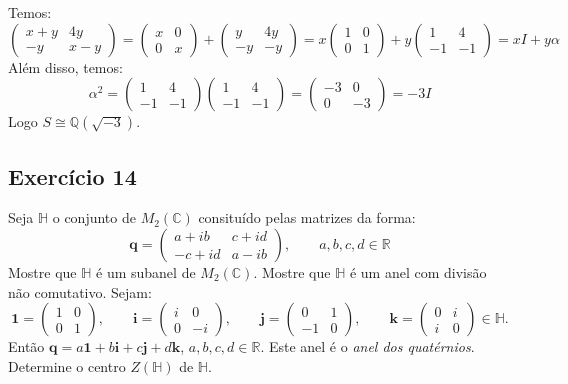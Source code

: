\documentclass[10pt,a4paper]{article}
\begin{document}
Temos:
\[
\begin{pmatrix}
x+y&4y\\-y&x-y
\end{pmatrix}
=\begin{pmatrix}
x&0\\0&x
\end{pmatrix}+\begin{pmatrix}
y&4y\\-y&-y
\end{pmatrix}=
x\begin{pmatrix}
1&0\\0&1
\end{pmatrix}+y\begin{pmatrix}
1&4\\-1&-1
\end{pmatrix}=xI+y\alpha
\]
Além disso, temos:
\[
\alpha^2=\begin{pmatrix}
1&4\\-1&-1
\end{pmatrix}\begin{pmatrix}
1&4\\-1&-1
\end{pmatrix}=\begin{pmatrix}
-3&0\\0&-3
\end{pmatrix}=-3I
\]
Logo $S\cong\mathbb{Q}(\sqrt{-3})$.

\subsection*{Exercício 14}

Seja $\mathbb{H}$ o conjunto de $M_2(\mathbb{C})$ consituído pelas matrizes da forma:
\[
\textbf{q}=\begin{pmatrix}
a+ib&c+id\\-c+id&a-ib
\end{pmatrix},\quad\quad a,b,c,d\in\mathbb{R}
\]
Mostre que $\mathbb{H}$ é um subanel de $M_2(\mathbb{C})$. Mostre que $\mathbb{H}$ é um anel com divisão não comutativo. Sejam:
\[
\textbf{1}=\begin{pmatrix}
1&0\\0&1
\end{pmatrix},\quad\quad\textbf{i}=\begin{pmatrix}
i&0\\0&-i
\end{pmatrix},\quad\quad\textbf{j}=\begin{pmatrix}
0&1\\-1&0
\end{pmatrix},\quad\quad\textbf{k}=\begin{pmatrix}
0&i\\i&0
\end{pmatrix}\in\mathbb{H}.
\]
Então $\textbf{q}=a\textbf{1}+b\textbf{i}+c\textbf{j}+d\textbf{k}$, $a,b,c,d\in\mathbb{R}$. Este anel é o \textit{anel dos quatérnios}. Determine o centro $Z(\mathbb{H})$ de $\mathbb{H}$.
\end{document}
